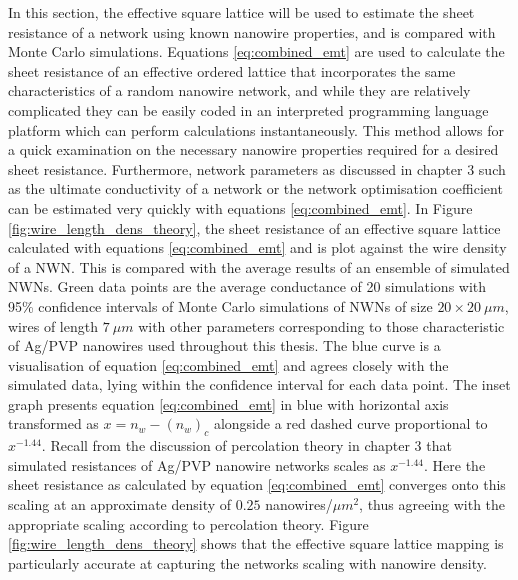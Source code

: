 In this section, the effective square lattice will be used to estimate the sheet resistance of a network using known nanowire properties, and is compared with Monte Carlo simulations. Equations \ref{eq:combined_emt} are used to calculate the sheet resistance of an effective ordered lattice that incorporates the same characteristics of a random nanowire network, and while they are relatively complicated they can be easily coded in an interpreted programming language platform which can perform calculations instantaneously. This method allows for a quick examination on the necessary nanowire properties required for a desired sheet resistance. Furthermore, network parameters as discussed in chapter 3 such as the ultimate conductivity of a network or the network optimisation coefficient can be estimated very quickly with equations \ref{eq:combined_emt}. In Figure \ref{fig:wire_length_dens_theory}, the sheet resistance of an effective square lattice calculated with equations \ref{eq:combined_emt} and is plot against the wire density of a NWN. This is compared with the average results of an ensemble of simulated NWNs. Green data points are the average conductance of 20 simulations with 95\% confidence intervals of Monte Carlo simulations of NWNs of size $20 \times 20~\mu m$, wires of length $7 ~ \mu m$ with other parameters corresponding to those characteristic of Ag/PVP nanowires used throughout this thesis\cite{rocha2015}. The blue curve is a visualisation of equation \ref{eq:combined_emt} and agrees closely with the simulated data, lying within the confidence interval for each data point. The inset graph presents equation \ref{eq:combined_emt} in blue with horizontal axis transformed as $x = n_w - (n_w)_c$ alongside a red dashed curve proportional to $x^{-1.44}$. Recall from the discussion of percolation theory in chapter 3 that simulated resistances of Ag/PVP nanowire networks scales as $x^{-1.44}$. Here the sheet resistance as calculated by equation \ref{eq:combined_emt} converges onto this scaling at an approximate density of $0.25$ nanowires/$\mu m^2$, thus agreeing with the appropriate scaling according to percolation theory\cite{li2009}. Figure \ref{fig:wire_length_dens_theory} shows that the effective square lattice mapping is particularly accurate at capturing the networks scaling with nanowire density.

